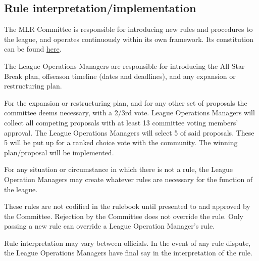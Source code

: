 \subsection{Rule interpretation/implementation}
\begin{deepEnumerate}
	\item The MLR Committee is responsible for introducing new rules and procedures to the league, and operates continuously within its own framework.
	Its constitution can be found \hyperref[sec:Committee Constitution]{here}.
	\item The League Operations Managers are responsible for introducing the All Star Break plan, offseason timeline (dates and deadlines), and any expansion or restructuring plan.
	\begin{deepEnumerate}
		\item For the expansion or restructuring plan, and for any other set of proposals the committee deems necessary, with a 2/3rd vote. League Operations Managers will collect all competing proposals with at least 13 committee voting members' approval. The League Operations Managers will select 5 of said proposals. These 5 will be put up for a ranked choice vote with the community. The winning plan/proposal will be implemented.
	\end{deepEnumerate}
	\item For any situation or circumstance in which there is not a rule, the League Operation Managers may create whatever rules are necessary
	for the function of the league.
	\begin{deepEnumerate}
		\item These rules are not codified in the rulebook until presented to and approved by the Committee.
		Rejection by the Committee does not override the rule. Only passing a new rule can override a League Operation Manager's rule.
	\end{deepEnumerate}
	\item Rule interpretation may vary between officials. In the event of any rule dispute, the League Operations Managers have final say in the interpretation of the rule.
\end{deepEnumerate}

